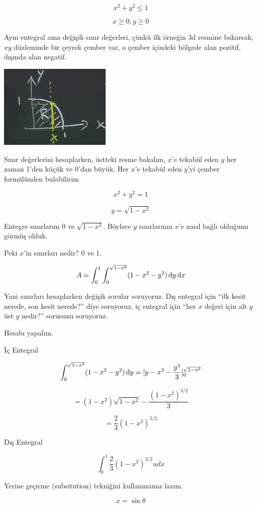 \documentclass[12pt,fleqn]{article}\usepackage{../../common}
\begin{document}
$$ x^2 + y^2 \le 1 $$

$$ x \ge 0, y \ge 0 $$

Aynı entegral ama değişik sınır değerleri, çünkü ilk örneğin 3d resmine
bakarsak, $xy$ düzleminde bir çeyrek çember var, o çember içindeki bölgede
alan pozitif, dışında alan negatif. 

\begin{center}
\includegraphics[height=4cm]{16_11.png}
\end{center}

Sınır değerlerini hesaplarken, üstteki resme bakalım, $x$'e tekabül eden $y$ her
zaman 1'den küçük ve 0'dan büyük. Her $x$'e tekabül eden $y$'yi çember
formülünden bulabilirim

$$ x^2 + y^2 =1 $$

$$ y = \sqrt{1-x^2} $$

Entegre sınırlarım 0 ve $\sqrt{1-x^2}$. Böylece $y$ sınırlarının $x$'e
nasıl bağlı olduğunu görmüş olduk. 

Peki $x$'in sınırları nedir? 0 ve 1. 

$$ A = \int_0^1 \int_0^{\sqrt{1-x^2}}  (1-x^2-y^2) \,\mathrm{d} y \,\mathrm{d} x $$

Yani sınırları hesaplarken değişik sorular soruyoruz. Dış entegral için ``ilk
kesit nerede, son kesit nerede?'' diye soruyoruz, iç entegral için ``her $x$
değeri için alt $y$ üst $y$ nedir?'' sorusunu soruyoruz.

Hesabı yapalım. 

İç Entegral 

$$
\int_0^{\sqrt{1-x^2}}  (1-x^2-y^2) \,\mathrm{d} y
= [ y - x^2 - \frac{y^3}{3} ]_0^{\sqrt{1-x^2}}
$$

$$ =  (1-x^2)\sqrt{1-x^2} - \frac{(1-x^2)^{3/2}}{3}$$

$$ = \frac{2}{3} (1-x^2)^{3/2} $$

Dış Entegral

$$ \int_0^1 \frac{2}{3} (1-x^2)^{3/2} ud x $$

Yerine geçirme (subsitution) tekniğini kullanmamız lazım. 

$$ x = \sin\theta $$
\end{document}
